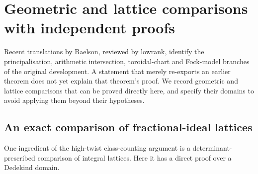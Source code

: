 \section{Geometric and lattice comparisons with independent proofs}
\label{sec:sr-geometric}
Recent translations by Baelson, reviewed by lowrank, identify the
principalisation, arithmetic intersection, toroidal-chart and Fock-model
branches of the original development. A statement that merely re-exports
an earlier theorem does not yet explain that theorem's proof.
We record geometric and lattice comparisons that can be proved directly here,
and specify their domains to avoid applying them beyond their hypotheses.

\subsection{An exact comparison of fractional-ideal lattices}
\label{sec:sr-ideal-lattices}
One ingredient of the high-twist class-counting argument is a
determinant-prescribed comparison of integral lattices.
Here it has a direct proof over a Dedekind domain.


